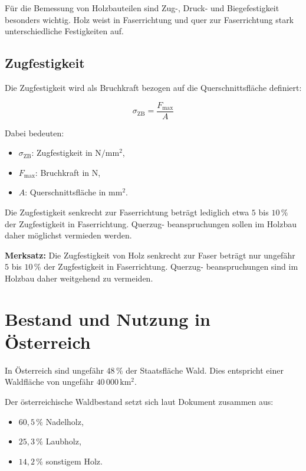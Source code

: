 \documentclass[
  12pt,
  a4paper,
  oneside
]{scrreprt}
\begin{document}
Für die Bemessung von Holzbauteilen sind Zug-, Druck- und
Biegefestigkeit besonders wichtig. Holz weist in Faserrichtung und quer
zur Faserrichtung stark unterschiedliche Festigkeiten auf.


\subsection{Zugfestigkeit}

Die Zugfestigkeit wird als Bruchkraft bezogen auf die
Querschnittsfläche definiert:

\begin{equation}
  \sigma_{\mathrm{ZB}} =
  \frac{F_{\mathrm{max}}}{A}
\end{equation}

Dabei bedeuten:

\begin{itemize}
  \item $\sigma_{\mathrm{ZB}}$: Zugfestigkeit in
  $\mathrm{N/mm^2}$,
  \item $F_{\mathrm{max}}$: Bruchkraft in $\mathrm{N}$,
  \item $A$: Querschnittsfläche in $\mathrm{mm^2}$.
\end{itemize}



Die Zugfestigkeit senkrecht zur Faserrichtung beträgt lediglich etwa
$5$ bis $10\,\%$ der Zugfestigkeit in Faserrichtung. Querzug-
beanspruchungen sollen im Holzbau daher möglichst vermieden werden.


\begin{merksatzbox}
\textbf{Merksatz:}
Die Zugfestigkeit von Holz senkrecht zur Faser beträgt nur ungefähr
$5$ bis $10\,\%$ der Zugfestigkeit in Faserrichtung. Querzug-
beanspruchungen sind im Holzbau daher weitgehend zu vermeiden.

\end{merksatzbox}

\section{Bestand und Nutzung in Österreich}

In Österreich sind ungefähr $48\,\%$ der Staatsfläche Wald. Dies
entspricht einer Waldfläche von ungefähr $40\,000\,\mathrm{km^2}$.


Der österreichische Waldbestand setzt sich laut Dokument zusammen aus:

\begin{itemize}
  \item $60{,}5\,\%$ Nadelholz,
  \item $25{,}3\,\%$ Laubholz,
  \item $14{,}2\,\%$ sonstigem Holz.
\end{itemize}
\end{document}
